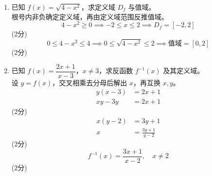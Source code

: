 \documentclass[12pt,a4paper]{exam-zh}
\begin{document}
\begin{solution}
    \begin{enumerate}[label=(\alph*)]
        \item 已知 $f(x) = \sqrt{4 - x^2}$，求定义域 $D_f$ 与值域。 \\
        根号内非负确定定义域，再由定义域范围反推值域。
        \[
            4 - x^2 \geq 0 \implies -2 \leq x \leq 2 \implies D_f = [-2,2]
        \]
        \hfill (2分)
        \[
            0 \leq 4-x^2 \leq 4 \implies 0 \leq \sqrt{4-x^2} \leq 2 \implies \text{值域} = [0,2]
        \]
        \hfill (2分)

        \item 已知 $f(x) = \dfrac{2x+1}{x-3}$，$x \neq 3$，求反函数 $f^{-1}(x)$ 及其定义域。 \\
        设 $y=f(x)$，交叉相乘去分母后解出 $x$，再互换 $x,y$。
        \begin{align*}
            y(x-3) &= 2x+1 \\
            xy - 3y &= 2x + 1
        \end{align*}
        \hfill (2分)
        \begin{align*}
            x(y-2) &= 3y+1 \\
            x &= \frac{3y+1}{y-2}
        \end{align*}
        \hfill (2分)
        \[
            f^{-1}(x) = \frac{3x+1}{x-2}, \quad x \neq 2
        \]
        \hfill (2分)
    \end{enumerate}
\end{solution}




\end{document}
